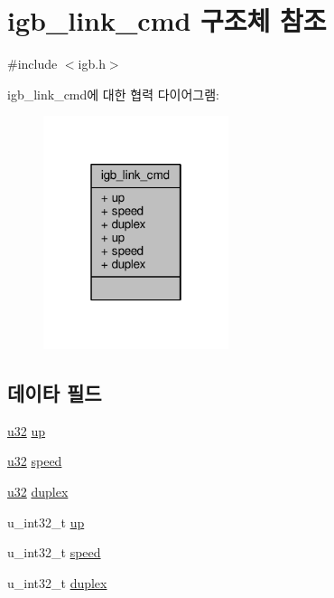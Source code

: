 \hypertarget{structigb__link__cmd}{}\section{igb\+\_\+link\+\_\+cmd 구조체 참조}
\label{structigb__link__cmd}


{\ttfamily \#include $<$igb.\+h$>$}



igb\+\_\+link\+\_\+cmd에 대한 협력 다이어그램\+:
\nopagebreak
\begin{figure}[H]
\begin{center}
\leavevmode
\includegraphics[width=154pt]{structigb__link__cmd__coll__graph}
\end{center}
\end{figure}
\subsection*{데이타 필드}
\begin{DoxyCompactItemize}
\item 
\hyperlink{lib_2igb_2e1000__osdep_8h_a64e91c10a0d8fb627e92932050284264}{u32} \hyperlink{structigb__link__cmd_ac27e774ae49a8be876d42d59686aec61}{up}
\item 
\hyperlink{lib_2igb_2e1000__osdep_8h_a64e91c10a0d8fb627e92932050284264}{u32} \hyperlink{structigb__link__cmd_a0d3e0f150bbdbd462d4a6dd4c20f5def}{speed}
\item 
\hyperlink{lib_2igb_2e1000__osdep_8h_a64e91c10a0d8fb627e92932050284264}{u32} \hyperlink{structigb__link__cmd_ab97627644bbfa45fd434e6f2493c8918}{duplex}
\item 
u\+\_\+int32\+\_\+t \hyperlink{structigb__link__cmd_a2f6e3c95f8f483142f9541c5f8c8b56a}{up}
\item 
u\+\_\+int32\+\_\+t \hyperlink{structigb__link__cmd_a124bfff52717ca85e31ddfe15426204d}{speed}
\item 
u\+\_\+int32\+\_\+t \hyperlink{structigb__link__cmd_ab56d31f9dbd9fd2ae5bfbd505bd2fcc2}{duplex}
\end{DoxyCompactItemize}


